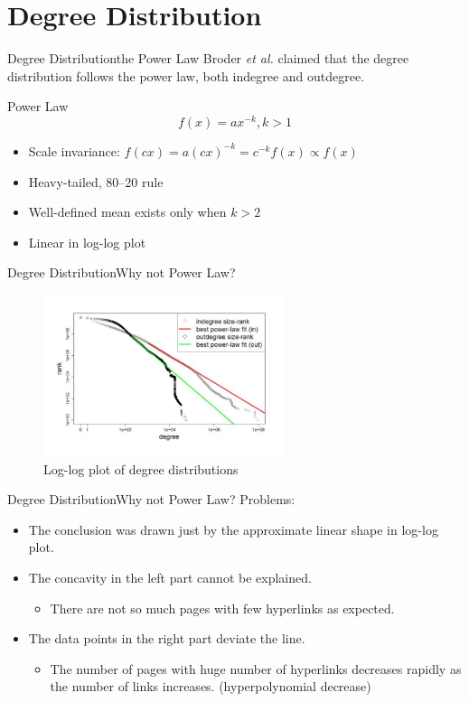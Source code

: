 \documentclass{beamer}
\begin{document}
  \section{Degree Distribution}
  \begin{frame}{Degree Distribution}{the Power Law}
    Broder \emph{et al.} claimed that the degree distribution follows the power law, both indegree and outdegree. \par
    \pause
    \begin{block}{Power Law}
    $$ f(x) = ax^{-k}, k > 1$$
    \end{block}
    \pause
    \begin{itemize}[<+->]
      \item Scale invariance: $ f(cx) = a(cx)^{-k} = c^{-k} f(x) \propto f(x)$
      \item Heavy-tailed, 80--20 rule
      \item Well-defined mean exists only when $k > 2$
      \item Linear in log-log plot
    \end{itemize}
  \end{frame}

  \begin{frame}{Degree Distribution}{Why not Power Law?}
    \begin{figure}
        \includegraphics[width = 7cm]{dist_plot.pdf}
        \caption{Log-log plot of degree distributions}
    \end{figure}
  \end{frame}
  
  \begin{frame}{Degree Distribution}{Why not Power Law?}
    Problems:
    \pause
    \begin{itemize}
      \item The conclusion was drawn just by the approximate linear shape in log-log plot.
      \pause
      \item The concavity in the left part cannot be explained.
      \begin{itemize}
        \item There are not so much pages with few hyperlinks as expected.
      \end{itemize}  
      \pause
      \item The data points in the right part deviate the line.
      \begin{itemize}
        \item The number of pages with huge number of hyperlinks decreases rapidly as the number of links increases. (hyperpolynomial decrease)
      \end{itemize}
    \end{itemize}
  \end{frame}
  
\end{document}
